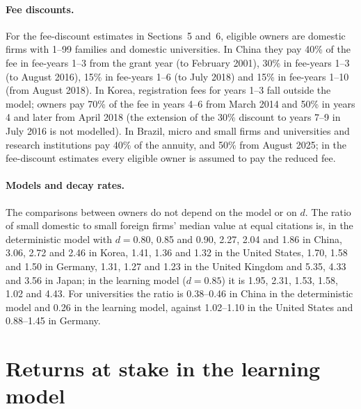 \paragraph{Fee discounts.} For the fee-discount estimates in Sections~5 and~6, eligible owners are domestic firms with 1--99
families and domestic universities. In China they pay 40\% of the fee in fee-years 1--3 from the grant year (to
February 2001), 30\% in fee-years 1--3 (to August 2016), 15\% in fee-years 1--6 (to July 2018) and 15\% in fee-years
1--10 (from August 2018). In Korea, registration fees for years 1--3 fall outside the model; owners pay 70\% of the
fee in years 4--6 from March 2014 and 50\% in years 4 and later from April 2018 (the extension of the 30\% discount to
years 7--9 in July 2016 is not modelled). In Brazil, micro and small firms and universities and research
institutions pay 40\% of the annuity, and 50\% from August 2025; in the fee-discount estimates every eligible owner is assumed to pay the reduced fee.

\paragraph{Models and decay rates.} The comparisons between owners do not depend on the model or on $d$. The ratio
of small domestic to small foreign firms' median value at equal citations is, in the deterministic model with
$d = 0.80$, 0.85 and 0.90, 2.27, 2.04 and 1.86 in China, 3.06, 2.72 and 2.46 in Korea, 1.41, 1.36 and 1.32 in the
United States, 1.70, 1.58 and 1.50 in Germany, 1.31, 1.27 and 1.23 in the United Kingdom and 5.35, 4.33 and 3.56 in
Japan; in the learning model ($d = 0.85$) it is 1.95, 2.31, 1.53, 1.58, 1.02 and 4.43. For universities the ratio
is 0.38--0.46 in China in the deterministic model and 0.26 in the learning model, against 1.02--1.10 in the United
States and 0.88--1.45 in Germany.





\clearpage
\newpage 

\section{Returns at stake in the learning model}\label{app:leverslearning}

